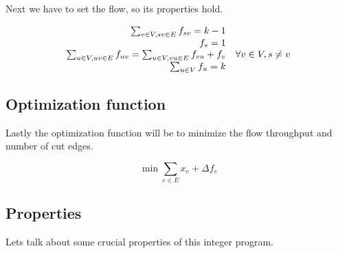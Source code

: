 \documentclass{article}
\theoremstyle{plain}
\theoremstyle{plain}
\theoremstyle{remark}
\begin{document}
	Next we have to set the flow, so its properties hold.
	
	$$
	\begin{array}{r l}
		\sum_{v \in V, sv \in E} f_{sv} = k-1 \\
		f_s = 1 \\
		\sum_{u \in V, uv \in E} f_{uv} = \sum_{u \in V, vu \in E} f_{vu} + f_v & \forall v \in V, s \neq v \\
		\sum_{u \in V} f_u = k
	\end{array}
	$$
	
	\subsection{Optimization function}
	
	Lastly the optimization function will be to minimize the flow throughput and number of cut edges.
	
	$$
	\min \sum_{e \in E} x_e + \Delta f_e
	$$
	
	\subsection{Properties}
	
	Lets talk about some crucial properties of this integer program.
\end{document}
